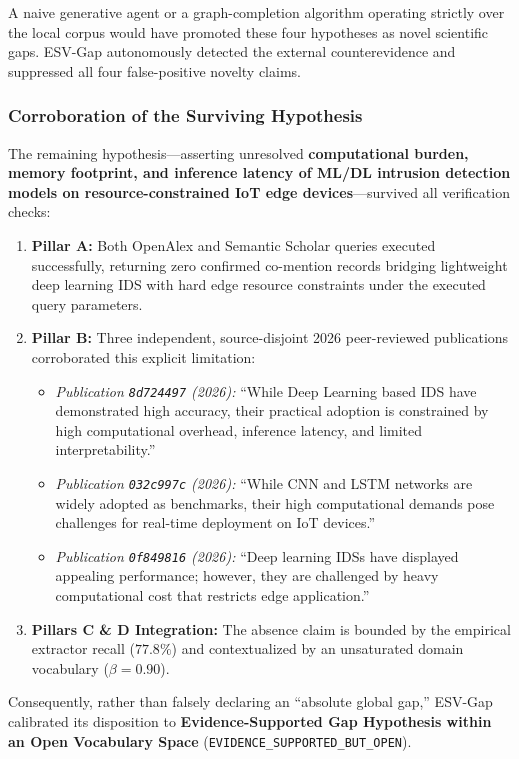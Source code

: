 \documentclass[conference,10pt]{IEEEtran}
\newcommand{\method}{ESV-Gap}
\begin{document}
A naive generative agent or a graph-completion algorithm operating strictly over the local corpus would have promoted these four hypotheses as novel scientific gaps. \method{} autonomously detected the external counterevidence and suppressed all four false-positive novelty claims.

\subsubsection{Corroboration of the Surviving Hypothesis}
The remaining hypothesis---asserting unresolved \textbf{computational burden, memory footprint, and inference latency of ML/DL intrusion detection models on resource-constrained IoT edge devices}---survived all verification checks:
\begin{enumerate}[label=\arabic*),leftmargin=1.8em]
  \item \textbf{Pillar A:} Both OpenAlex and Semantic Scholar queries executed successfully, returning zero confirmed co-mention records bridging lightweight deep learning IDS with hard edge resource constraints under the executed query parameters.
  \item \textbf{Pillar B:} Three independent, source-disjoint 2026 peer-reviewed publications corroborated this explicit limitation:
    \begin{itemize}
      \item \emph{Publication \texttt{8d724497} (2026):} ``While Deep Learning based IDS have demonstrated high accuracy, their practical adoption is constrained by high computational overhead, inference latency, and limited interpretability.''
      \item \emph{Publication \texttt{032c997c} (2026):} ``While CNN and LSTM networks are widely adopted as benchmarks, their high computational demands pose challenges for real-time deployment on IoT devices.''
      \item \emph{Publication \texttt{0f849816} (2026):} ``Deep learning IDSs have displayed appealing performance; however, they are challenged by heavy computational cost that restricts edge application.''
    \end{itemize}
  \item \textbf{Pillars C \& D Integration:} The absence claim is bounded by the empirical extractor recall ($77.8\%$) and contextualized by an unsaturated domain vocabulary ($\beta = 0.90$).
\end{enumerate}

Consequently, rather than falsely declaring an ``absolute global gap,'' \method{} calibrated its disposition to \textbf{Evidence-Supported Gap Hypothesis within an Open Vocabulary Space} (\texttt{EVIDENCE\_SUPPORTED\_BUT\_OPEN}).
\end{document}
